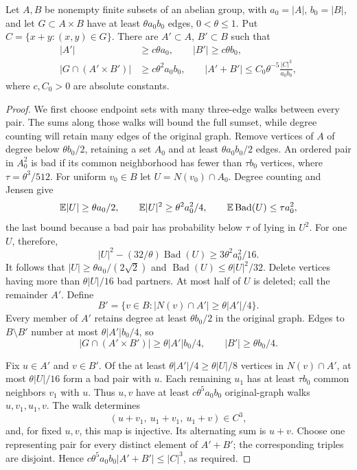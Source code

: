 \begin{lemma}\label{re:graph-bsg}
Let \(A,B\) be nonempty finite subsets of an abelian group, with
\(a_0=|A|\), \(b_0=|B|\), and let \(G\subset A\times B\) have at least
\(\theta a_0b_0\) edges, \(0<\theta\le1\).  Put
\(C=\{x+y:(x,y)\in G\}\).  There are \(A'\subset A\), \(B'\subset B\)
such that
\begin{align*}
 |A'|&\ge c\theta a_0,\qquad |B'|\ge c\theta b_0,\\
 |G\cap(A'\times B')|&\ge c\theta^2a_0b_0,\qquad
 |A'+B'|\le C_0\theta^{-5}\frac{|C|^3}{a_0b_0},
\end{align*}
where \(c,C_0>0\) are absolute constants.
\end{lemma}
\begin{proof}
We first choose endpoint sets with many three-edge walks between every
pair.  The sums along those walks will bound the full sumset, while
degree counting will retain many edges of the original graph.
Remove vertices of \(A\) of degree below \(\theta b_0/2\), retaining
a set \(A_0\) and at least \(\theta a_0b_0/2\) edges.  An ordered pair
in \(A_0^2\) is bad if its common neighborhood has fewer than
\(\tau b_0\) vertices, where \(\tau=\theta^3/512\).  For uniform
\(v_0\in B\) let \(U=N(v_0)\cap A_0\).  Degree counting and Jensen give
\[
 \mathbb E|U|\ge\theta a_0/2,\qquad
 \mathbb E|U|^2\ge\theta^2a_0^2/4,\qquad
 \mathbb E\operatorname{Bad}(U)\le\tau a_0^2,
\]
the last bound because a bad pair has probability below \(\tau\) of
lying in \(U^2\).  For one \(U\), therefore,
\[
 |U|^2-(32/\theta)\operatorname{Bad}(U)
 \ge 3\theta^2a_0^2/16.
\]
It follows that \(|U|\ge\theta a_0/(2\sqrt2)\) and
\(\operatorname{Bad}(U)\le\theta|U|^2/32\).  Delete vertices having
more than \(\theta|U|/16\) bad partners.  At most half of \(U\) is
deleted; call the remainder \(A'\).  Define
\[
 B'=\{v\in B:|N(v)\cap A'|\ge\theta|A'|/4\}.
\]
Every member of \(A'\) retains degree at least \(\theta b_0/2\) in
the original graph.  Edges to \(B\setminus B'\) number at most
\(\theta|A'|b_0/4\), so
\[
 |G\cap(A'\times B')|\ge\theta|A'|b_0/4,
 \qquad |B'|\ge\theta b_0/4.
\]

Fix \(u\in A'\) and \(v\in B'\).  Of the at least
\(\theta|A'|/4\ge\theta|U|/8\) vertices in \(N(v)\cap A'\), at most
\(\theta|U|/16\) form a bad pair with \(u\).  Each remaining \(u_1\)
has at least \(\tau b_0\) common neighbors \(v_1\) with \(u\).
Thus \(u,v\) have at least \(c\theta^5a_0b_0\) original-graph walks
\(u,v_1,u_1,v\).  The walk determines
\[
 (u+v_1,\ u_1+v_1,\ u_1+v)\in C^3,
\]
and, for fixed \(u,v\), this map is injective.  Its alternating sum
is \(u+v\).  Choose one representing pair for every distinct element
of \(A'+B'\); the corresponding triples are disjoint.  Hence
\(c\theta^5a_0b_0|A'+B'|\le |C|^3\), as required.
\end{proof}

